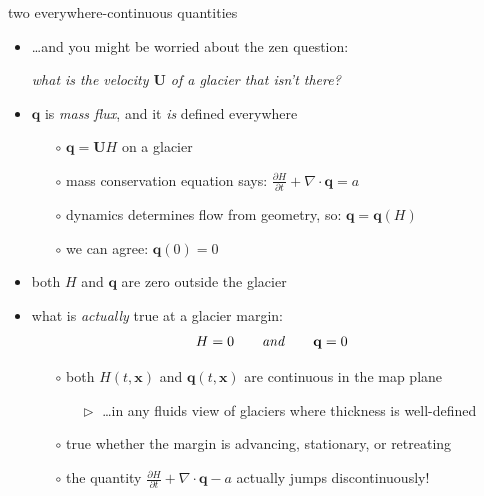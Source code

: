 \documentclass[10pt,hyperref,dvipsnames]{beamer}
\newcommand{\bq}{\mathbf{q}}
\newcommand{\bx}{\mathbf{x}}
\newcommand{\bU}{\mathbf{U}}
\newcommand{\Div}{\nabla\cdot}
\begin{document}
\begin{frame}{two everywhere-continuous quantities}
\begin{itemize}
\item \dots and you might be worried about the zen question:

\begin{center}
\emph{what is the velocity $\bU$ of a glacier that isn't there?}
\end{center}

\vspace{5mm}
\item<2-4> $\bq$ is \emph{mass flux}, and it \emph{is} defined everywhere
    \begin{itemize}
    \item[$\circ$] $\bq = \bU H$ on a glacier
    \item[$\circ$] mass conservation equation says: $\frac{\partial H}{\partial t} + \Div \bq = a$
    \item[$\circ$] dynamics determines flow from geometry, so: \quad $\bq=\bq(H)$
    \item[$\circ$] we can agree: \quad $\bq(0)=0$
    \end{itemize}
\item<2-4> both $H$ and $\bq$ are zero outside the glacier
\item<3-4> what is \emph{actually} true at a glacier margin:
   $$H=0 \qquad \text{\emph{and}} \qquad \bq = 0$$

    \vspace{-1mm}
    \begin{itemize}
    \item[$\circ$] \alert{both $H(t,\bx)$ and $\bq(t,\bx)$ are continuous in the map plane}
        \begin{itemize}
        \item[$\vartriangleright$] \dots in any fluids view of glaciers where thickness is well-defined
        \end{itemize}
    \item[$\circ$] true whether the margin is advancing, stationary, or retreating
    \item[$\circ$] the quantity \quad $\frac{\partial H}{\partial t} + \Div \bq - a$ \quad actually jumps discontinuously!
    \end{itemize}
\end{itemize}
\end{frame}
\end{document}
